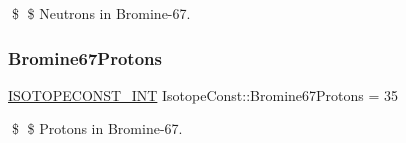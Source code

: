 \$ \$ Neutrons in Bromine-\/67. \mbox{\label{group___isotope_const-_bromine-_br67_ga7f48cc4704d4db8d6802aa6083db6078}} 
\subsubsection{\texorpdfstring{Bromine67\+Protons}{Bromine67Protons}}
{\footnotesize\ttfamily \mbox{\hyperlink{group___isotope_const-_macros_ga5f18360b3e99483a35c32d789e62621c}{I\+S\+O\+T\+O\+P\+E\+C\+O\+N\+S\+T\+\_\+\+I\+NT}} Isotope\+Const\+::\+Bromine67\+Protons = 35}

\$ \$ Protons in Bromine-\/67. 